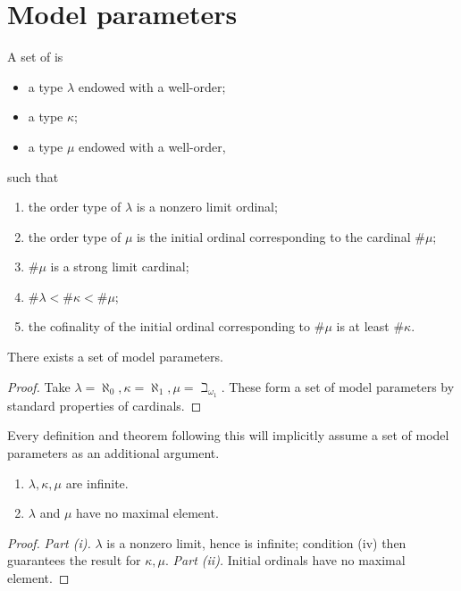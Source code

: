 \section{Model parameters}

\begin{definition}
    \label{def:params}
    A set of  is
    \begin{itemize}
        \item a type \( \lambda \) endowed with a well-order;
        \item a type \( \kappa \);
        \item a type \( \mu \) endowed with a well-order,
    \end{itemize}
    such that
    \begin{enumerate}
        \item the order type of \( \lambda \) is a nonzero limit ordinal;
        \item the order type of \( \mu \) is the initial ordinal corresponding to the cardinal \( \#\mu \);
        \item \( \#\mu \) is a strong limit cardinal;
        \item \( \#\lambda < \#\kappa < \#\mu \);
        \item the cofinality of the initial ordinal corresponding to \( \#\mu \) is at least \( \#\kappa \).
    \end{enumerate}
\end{definition}
\begin{lemma}
    There exists a set of model parameters.
\end{lemma}
\begin{proof}
    Take \( \lambda = \aleph_0, \kappa = \aleph_1, \mu = \beth_{\omega_1} \).
    These form a set of model parameters by standard properties of cardinals.
\end{proof}
Every definition and theorem following this will implicitly assume a set of model parameters as an additional argument.
\begin{lemma}
    \label{lem:infinite_no_max_model_params}
    \begin{enumerate}
        \item \( \lambda, \kappa, \mu \) are infinite.
        \item \( \lambda \) and \( \mu \) have no maximal element.
    \end{enumerate}
\end{lemma}
\begin{proof}
    \emph{Part (i).}
    \( \lambda \) is a nonzero limit, hence is infinite; condition (iv) then guarantees the result for \( \kappa, \mu \).
    \emph{Part (ii).}
    Initial ordinals have no maximal element.
\end{proof}
